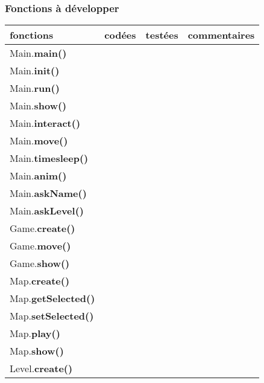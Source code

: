 \documentclass[a4paper]{article}
\begin{document}
            \subsubsection{Fonctions à développer}
            \begin{tabular}{|l|c|c|c|}
                \hline
                fonctions & codées & testées & commentaires \\
                \hline
                Main.\textbf{main()} & & & \\
                \hline
                Main.\textbf{init()} & & & \\
                \hline
                Main.\textbf{run()}  & & & \\
                \hline
                Main.\textbf{show()} & & & \\
                \hline
                Main.\textbf{interact()} & & & \\
                \hline
                Main.\textbf{move()} & & & \\
                \hline
                Main.\textbf{timesleep()} & & & \\
                \hline
                Main.\textbf{anim()} & & & \\
                \hline 
                Main.\textbf{askName()} & & & \\
                \hline
                Main.\textbf{askLevel()} & & & \\
                \hline
                \hline
                Game.\textbf{create()} & & & \\
                \hline
                Game.\textbf{move()} & & & \\
                \hline
                Game.\textbf{show()} & & & \\
                \hline 
                \hline
                Map.\textbf{create()} & & & \\
                \hline
                Map.\textbf{getSelected()} & & & \\
                \hline
                Map.\textbf{setSelected()} & & & \\
                \hline
                Map.\textbf{play()} & & & \\
                \hline
                Map.\textbf{show()} & & & \\
                \hline
                \hline
                Level.\textbf{create()} & & & \\
                \hline

\end{tabular}
\end{document}
